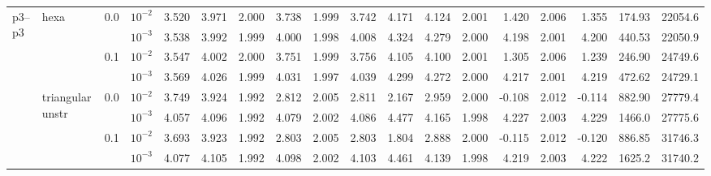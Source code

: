 \begin{longtable}{llclrrrrrrrrrrrrrr}
\multirow{8}{*}{p3--p3} & \multirow{4}{*}{hexa} & \multirow{2}{*}{0.0} & $10^{-2}$ & 3.520 & 3.971 & 2.000 & 3.738 & 1.999 & 3.742 & 4.171 & 4.124 & 2.001 & 1.420 & 2.006 & 1.355 & 174.93 & 22054.6 \\
& & & $10^{-3}$ & 3.538 & 3.992 & 1.999 & 4.000 & 1.998 & 4.008 & 4.324 & 4.279 & 2.000 & 4.198 & 2.001 & 4.200 & 440.53 & 22050.9 \\\cline{3-18}
& & \multirow{2}{*}{0.1} & $10^{-2}$ & 3.547 & 4.002 & 2.000 & 3.751 & 1.999 & 3.756 & 4.105 & 4.100 & 2.001 & 1.305 & 2.006 & 1.239 & 246.90 & 24749.6 \\
& & & $10^{-3}$ & 3.569 & 4.026 & 1.999 & 4.031 & 1.997 & 4.039 & 4.299 & 4.272 & 2.000 & 4.217 & 2.001 & 4.219 & 472.62 & 24729.1 \\\cline{2-18}
& \multirow{4}{*}{triangular unstr} & \multirow{2}{*}{0.0} & $10^{-2}$ & 3.749 & 3.924 & 1.992 & 2.812 & 2.005 & 2.811 & 2.167 & 2.959 & 2.000 & -0.108 & 2.012 & -0.114 & 882.90 & 27779.4 \\
& & & $10^{-3}$ & 4.057 & 4.096 & 1.992 & 4.079 & 2.002 & 4.086 & 4.477 & 4.165 & 1.998 & 4.227 & 2.003 & 4.229 & 1466.0 & 27775.6 \\\cline{3-18}
& & \multirow{2}{*}{0.1} & $10^{-2}$ & 3.693 & 3.923 & 1.992 & 2.803 & 2.005 & 2.803 & 1.804 & 2.888 & 2.000 & -0.115 & 2.012 & -0.120 & 886.85 & 31746.3 \\
& & & $10^{-3}$ & 4.077 & 4.105 & 1.992 & 4.098 & 2.002 & 4.103 & 4.461 & 4.139 & 1.998 & 4.219 & 2.003 & 4.222 & 1625.2 & 31740.2 \\\hline

\bottomrule
\end{longtable}
\normalsize
